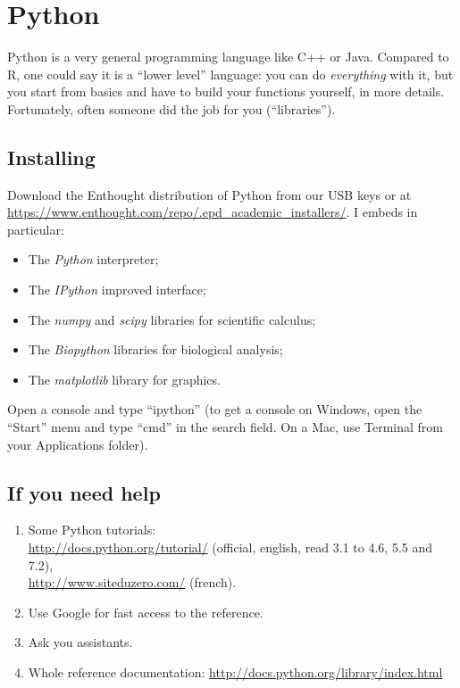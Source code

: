 \documentclass[a4paper,11pt]{article}
\begin{document}
\clearpage

\section{Python}

Python is a very general programming language like C++ or Java. Compared to R, one could say it is a ``lower level'' language:
you can do {\it everything} with it, but you start from basics and have to build your functions yourself, in more details.
Fortunately, often someone did the job for you (``libraries'').

\subsection{Installing}
Download the Enthought distribution of Python from our USB keys or at\\ \url{https://www.enthought.com/repo/.epd_academic_installers/}. I embeds in particular:
\begin{itemize}
\item The {\it Python} interpreter;
\item The {\it IPython} improved interface;
\item The {\it numpy} and {\it scipy} libraries for scientific calculus;
\item The {\it Biopython} libraries for biological analysis;
\item The {\it matplotlib} library for graphics.
\end{itemize}

Open a console and type ``ipython''
(to get a console on Windows, open the ``Start'' menu and type ``cmd'' in the search field. On a Mac, use Terminal 
from your Applications folder).

\subsection{If you need help}
\begin{enumerate}
\item Some Python tutorials: \\
      \url{http://docs.python.org/tutorial/} (official, english, read 3.1 to 4.6, 5.5 and 7.2),\\
      \url{http://www.siteduzero.com/} (french).
\item Use Google for fast access to the reference.
\item Ask you assistants.
\item Whole reference documentation: \url{http://docs.python.org/library/index.html}
\end{enumerate}
\end{document}
